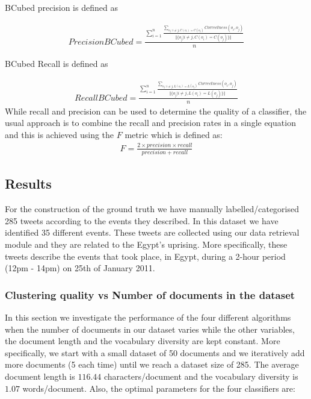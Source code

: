 BCubed precision is defined as 

\begin{eqnarray}
Precision BCubed = \frac{ \sum_{i=1}^{n} \frac{\sum_{o_j:i \neq j, C(o_i)=C(o_j)}^{} Correctness(o_i, o_j)}{\Vert \{ o_j | i \neq j, C(o_i) = C(o_j)  \}  \Vert} }{n}
\end{eqnarray} 

BCubed Recall is defined as

\begin{eqnarray}
Recall BCubed = \frac{ \sum_{i=1}^{n} \frac{\sum_{o_j:i \neq j, L(o_i)=L(o_j)}^{} Correctness(o_i, o_j)}{\Vert \{ o_j | i \neq j, L(o_i) = L(o_j)  \}  \Vert} }{n}
\end{eqnarray} 
While recall and precision can be used to determine the quality of a classifier, the usual approach is to combine the recall and precision rates in a single equation and this is 
achieved using the $F$ metric which is defined as:
\begin{eqnarray}
F = \frac{2 \times precision \times recall}{precision + recall}
\end{eqnarray} 
    
\subsection{Results}
For the construction of the ground truth we have manually labelled/categorised 285 tweets according to the events they described. In this dataset we have identified 35 different events. These tweets are collected using our data retrieval module and they are related to the Egypt's uprising. More specifically, these tweets describe the events that took place, in Egypt, during a 2-hour period (12pm - 14pm) on 25th of January 2011.    

\subsubsection{Clustering quality vs Number of documents in the dataset}\label{EvalDiffNoDocs}
In this section we investigate the performance of the four different algorithms when the number of documents in our dataset varies while the other variables, the document length and the vocabulary diversity are kept constant. More specifically, we start with a small dataset of 50 documents and we iteratively add more documents (5 each time) until we reach a dataset size of 285. The average document length is $116.44$ characters/document and the vocabulary diversity is $1.07$ words/document. Also, the optimal parameters for the four classifiers are:


